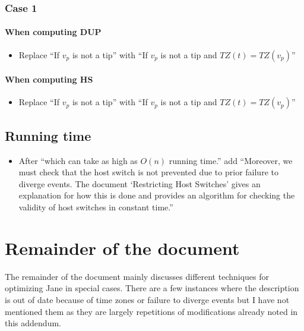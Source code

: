 \documentclass{article}
\begin{document}
\subsubsection{Case 1}
\paragraph{When computing DUP}
\begin{itemize}
\item Replace ``If $v_{p}$ is not a tip'' with ``If $v_{p}$ is not a tip and $TZ(t) = TZ(v_{p})$''
\end{itemize}

\paragraph{When computing HS}
\begin{itemize}
\item Replace ``If $v_{p}$ is not a tip'' with ``If $v_{p}$ is not a tip and $TZ(t) = TZ(v_{p})$''
\end{itemize}

\subsection{Running time}
\begin{itemize}
\item After ``which can take as high as $O(n)$ running time.'' add ``Moreover, we must check that the host switch is not prevented due to prior failure to diverge events. The document `Restricting Host Switches' gives an explanation for how this is done and provides an algorithm for checking the validity of host switches in constant time.''
\end{itemize}

\section{Remainder of the document}
The remainder of the document mainly discusses different techniques for optimizing Jane in special cases. There are a few instances where the description is out of date because of time zones or failure to diverge events but I have not mentioned them as they are largely repetitions of modifications already noted in this addendum. 
\end{document}
